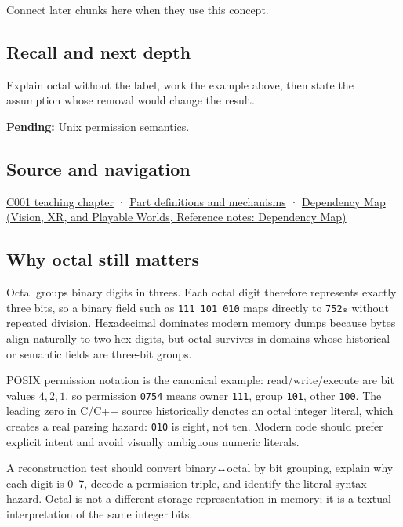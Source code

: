 Connect later chunks here when they use this concept.

\subsection{Recall and next depth}\label{appendix-17fc1bc8b305-recall-and-next-depth}

\hypertarget{appendix-17fc1bc8b305-recall-and-next-depth}{}

Explain octal without the label, work the example above, then state the assumption whose removal would change the result.

\textbf{Pending:} Unix permission semantics.

\subsection{Source and navigation}\label{appendix-17fc1bc8b305-source-and-navigation}

\hypertarget{appendix-17fc1bc8b305-source-and-navigation}{}

\hyperref[01-foundations-i-ch001-from-a-signal-to-an-interpretation]{C001 teaching chapter} · \hyperref[appendix-fd090d982a15]{Part definitions and mechanisms} · \href{../07-Vision-XR-and-Playable-Worlds/main.pdf\#nameddest=appendix-4ad47bdd269a}{Dependency Map (Vision, XR, and Playable Worlds, Reference notes: Dependency Map)}

\subsection{Why octal still matters}\label{appendix-17fc1bc8b305-why-octal-still-matters}

\hypertarget{appendix-17fc1bc8b305-why-octal-still-matters}{}

Octal groups binary digits in threes. Each octal digit therefore represents exactly three bits, so a binary field such as \texttt{111\ 101\ 010} maps directly to \texttt{752₈} without repeated division. Hexadecimal dominates modern memory dumps because bytes align naturally to two hex digits, but octal survives in domains whose historical or semantic fields are three-bit groups.

POSIX permission notation is the canonical example: read/write/execute are bit values \(4,2,1\), so permission \texttt{0754} means owner \texttt{111}, group \texttt{101}, other \texttt{100}. The leading zero in C/C++ source historically denotes an octal integer literal, which creates a real parsing hazard: \texttt{010} is eight, not ten. Modern code should prefer explicit intent and avoid visually ambiguous numeric literals.

A reconstruction test should convert binary↔octal by bit grouping, explain why each digit is 0--7, decode a permission triple, and identify the literal-syntax hazard. Octal is not a different storage representation in memory; it is a textual interpretation of the same integer bits.
